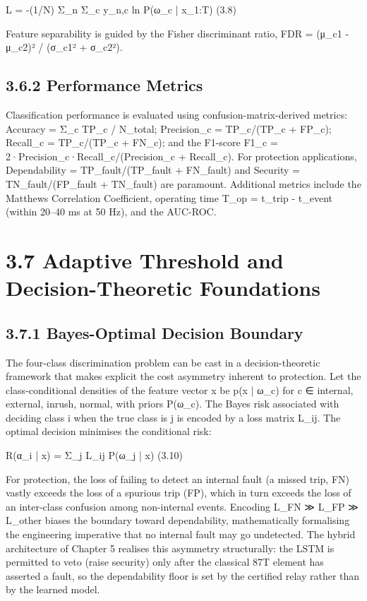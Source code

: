 L = -(1/N) Σ\_n Σ\_c y\_{n,c} ln P(ω\_c | x\_{1:T})	(3.8)

Feature separability is guided by the Fisher discriminant ratio, FDR = (μ\_c1 - μ\_c2)² / (σ\_c1² + σ\_c2²).


\subsection{3.6.2  Performance Metrics}
Classification performance is evaluated using confusion-matrix-derived metrics: Accuracy = Σ\_c TP\_c / N\_total; Precision\_c = TP\_c/(TP\_c + FP\_c); Recall\_c = TP\_c/(TP\_c + FN\_c); and the F1-score F1\_c = 2·Precision\_c·Recall\_c/(Precision\_c + Recall\_c). For protection applications, Dependability = TP\_fault/(TP\_fault + FN\_fault) and Security = TN\_fault/(FP\_fault + TN\_fault) are paramount. Additional metrics include the Matthews Correlation Coefficient, operating time T\_op = t\_trip - t\_event (within 20--40 ms at 50 Hz), and the AUC-ROC.


\section{3.7  Adaptive Threshold and Decision-Theoretic Foundations}

\subsection{3.7.1  Bayes-Optimal Decision Boundary}
The four-class discrimination problem can be cast in a decision-theoretic framework that makes explicit the cost asymmetry inherent to protection. Let the class-conditional densities of the feature vector x be p(x | ω\_c) for c ∈ {internal, external, inrush, normal}, with priors P(ω\_c). The Bayes risk associated with deciding class i when the true class is j is encoded by a loss matrix L\_{ij}. The optimal decision minimises the conditional risk:

R(α\_i | x) = Σ\_j L\_{ij} P(ω\_j | x)	(3.10)

For protection, the loss of failing to detect an internal fault (a missed trip, FN) vastly exceeds the loss of a spurious trip (FP), which in turn exceeds the loss of an inter-class confusion among non-internal events. Encoding L\_{FN} ≫ L\_{FP} ≫ L\_{other} biases the boundary toward dependability, mathematically formalising the engineering imperative that no internal fault may go undetected. The hybrid architecture of Chapter 5 realises this asymmetry structurally: the LSTM is permitted to veto (raise security) only after the classical 87T element has asserted a fault, so the dependability floor is set by the certified relay rather than by the learned model.



